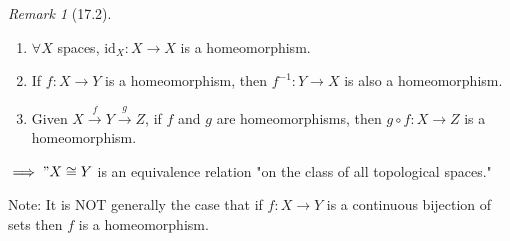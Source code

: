 \documentclass{article}
\newcommand{\func}[3]{\ensuremath{#1: #2 \to #3}}
\theoremstyle{definition}
\theoremstyle{remark}
\newtheorem*{rmk}{Remark}
\begin{document}
{        \begin{rmk}[17.2] \hfill
            \begin{enumerate}
                \item $\forall X$ spaces, $\func{\mathrm{id}_X}{X}{X}$ is a homeomorphism.
                \item If $\func{f}{X}{Y}$ is a homeomorphism, then $\func{f^{-1}}{Y}{X}$ is also a homeomorphism.
                \item Given $X \xrightarrow{f} Y \xrightarrow{g} Z$, if $f$ and $g$ are homeomorphisms, then $\func{g\circ f}{X}{Z}$ is a homeomorphism.
            \end{enumerate}
            $\implies "X\cong Y$ is an equivalence relation "on the class of all topological spaces."
        \end{rmk}
        
        Note: It is NOT generally the case that if $\func{f}{X}{Y}$ is a continuous bijection of sets then $f$ is a homeomorphism.
        
}
\end{document}
